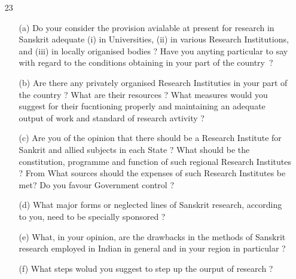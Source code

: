 {\rm 
\begin{itemize}

   \item[23] \begin{itemize}
             \item[(a)] Do your consider the provision avialable at present for research in Sanskrit adequate (i) in Universities, (ii) in various Research Institutions, and (iii) in locally origanised bodies ? Have you anyting particular to say with regard to the conditions obtaining in your part of the country~?
             
             \item[(b)] Are there any privately organised Research Instituties in your part of the country ? What are their resources ? What measures would you suggest for their fucntioning properly and maintaining an adequate output of work and standard of research avtivity ?
   
              \item[(c)] Are you of the opinion that there should be a Research Institute for Sankrit and allied subjects in each State ? What should be the constitution, programme and function of such regional Research Institutes ? From What sources should the expenses of such Research Institutes be met? Do you favour Government  control ? 
              
              \item[(d)] What major forms or neglected lines of Sanskrit research, according to you, need to be specially sponsored ?
              
              \item[(e)] What, in your opinion, are the drawbacks in the methods of Sanskrit research employed in Indian in general and in your region in particular ? 
              
              \item[(f)] What steps wolud you suggest to step up the ourput of research ?
              \end{itemize}
\end{itemize}
}


